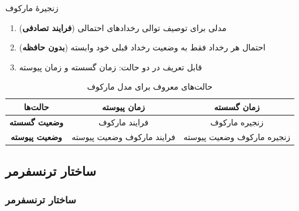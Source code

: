 \documentclass[xcolor=dvipsnames, professionalfonts, aspectratio=169, 11pt]{beamer}
\begin{document}
\begin{persian}
\begin{frame}
	زنجیرهٔ مارکوف
	\begin{enumerate}
		\item مدلی برای توصیف توالی رخدادهای احتمالی (\textbf{فرایند تصادفی})
		\item احتمال هر رخداد فقط به وضعیت رخداد قبلی خود وابسته (\textbf{بدون حافظه})
		\item قابل تعریف در دو حالت: زمان گسسته و زمان پیوسته
	\end{enumerate}
	\pause
	\begin{table}
		\caption{حالت‌های معروف برای مدل مارکوف}
		\vspace{0em}
		\small
		\begin{tabular}{|c|c|c|}
			\hline
			\textbf{حالت‌ها}       & \textbf{زمان پیوسته}       & \textbf{زمان گسسته}        \\
			\hline
			\textbf{وضعیت گسسته}  & فرایند مارکوف              & زنجیره مارکوف              \\
			\hline
			\textbf{وضعیت پیوسته} & فرایند مارکوف وضعیت پیوسته & زنجیره مارکوف وضعیت پیوسته \\
			\hline
		\end{tabular}
	\end{table}
	
\end{frame}








\subsection{ساختار ترنسفرمر}
\begin{frame}
	\frametitle{ساختار ترنسفرمر}
	
	
\end{frame}



















\end{persian}
\end{document}
